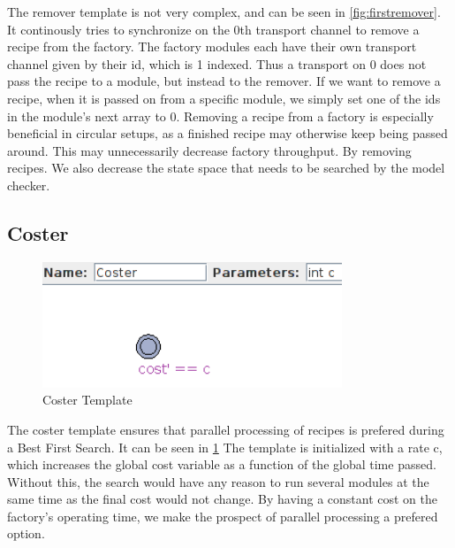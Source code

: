 The remover template is not very complex, and can be seen in \cref{fig:firstremover}. It continously tries to synchronize on the 0th transport channel to remove a recipe from the factory. The factory modules each have their own transport channel given by their id, which is 1 indexed. Thus a transport on 0 does not pass the recipe to a module, but instead to the remover. If we want to remove a recipe, when it is passed on from a specific module, we simply set one of the ids in the module’s next array to 0. Removing a recipe from a factory is especially beneficial in circular setups, as a finished recipe may otherwise keep being passed around. This may unnecessarily decrease factory throughput. By removing recipes. We also decrease the state space that needs to be searched by the model checker.  


\subsection{Coster}

\begin{figure}
\centering
\includegraphics[width=0.8\textwidth]{images/firstcoster.png}
\caption{Coster Template}
\label{fig:firstcoster}
\end{figure}

The coster template ensures that parallel processing of recipes is prefered during a Best First Search. It can be seen in \cref{fig:firstcoster} The template is initialized with a rate c, which increases the global cost variable as a function of the global time passed. Without this, the search would have any reason to run several modules at the same time as the final cost would not change. By having a constant cost on the factory’s operating time, we make the prospect of parallel processing a prefered option.  



